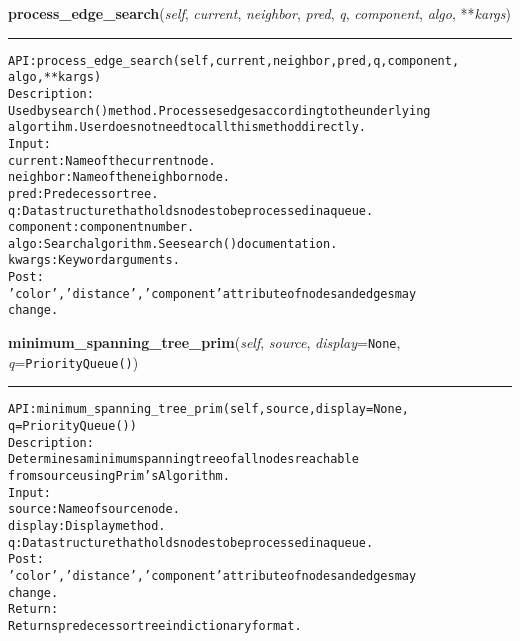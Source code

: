 \hspace{.8\funcindent}\begin{boxedminipage}{\funcwidth}

    \raggedright \textbf{process\_edge\_search}(\textit{self}, \textit{current}, \textit{neighbor}, \textit{pred}, \textit{q}, \textit{component}, \textit{algo}, **\textit{kargs})

    \vspace{-1.5ex}

    \rule{\textwidth}{0.5\fboxrule}
\setlength{\parskip}{2ex}
\begin{alltt}

API: process\_edge\_search(self, current, neighbor, pred, q, component,
                         algo, **kargs)
Description:
Used by search() method. Processes edges according to the underlying
algortihm. User does not need to call this method directly.
Input:
    current: Name of the current node.
    neighbor: Name of the neighbor node.
    pred: Predecessor tree.
    q: Data structure that holds nodes to be processed in a queue.
    component: component number.
    algo: Search algorithm. See search() documentation.
    kwargs: Keyword arguments.
Post:
    'color', 'distance', 'component' attribute of nodes and edges may
    change.
\end{alltt}

\setlength{\parskip}{1ex}
    \end{boxedminipage}

    \label{coinor:gimpy:graph:Graph:minimum_spanning_tree_prim}

    \vspace{0.5ex}

\hspace{.8\funcindent}\begin{boxedminipage}{\funcwidth}

    \raggedright \textbf{minimum\_spanning\_tree\_prim}(\textit{self}, \textit{source}, \textit{display}={\tt None}, \textit{q}={\tt PriorityQueue()})

    \vspace{-1.5ex}

    \rule{\textwidth}{0.5\fboxrule}
\setlength{\parskip}{2ex}
\begin{alltt}

API: minimum\_spanning\_tree\_prim(self, source, display = None,
                                q = PriorityQueue())
Description:
Determines a minimum spanning tree of all nodes reachable
from source using Prim's Algorithm.
Input:
    source: Name of source node.
    display: Display method.
    q: Data structure that holds nodes to be processed in a queue.
Post:
    'color', 'distance', 'component' attribute of nodes and edges may
    change.
Return:
    Returns predecessor tree in dictionary format.
\end{alltt}

\setlength{\parskip}{1ex}
    \end{boxedminipage}

